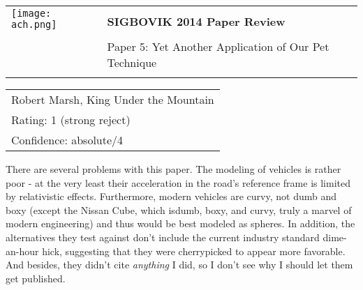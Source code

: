 \documentclass[12pt]{article}
\begin{document}
{\sffamily
\begin{tabular}{ll}
\multirow{2}{*}{\texttt{[image: ach.png]}}\\
& \textbf{\Huge{SIGBOVIK 2014 Paper Review}} \\ &\\
& \LARGE{Paper 5: Yet Another Application of Our Pet Technique} \\
&\\
\hline
\end{tabular}}
\vspace{2em}

{\large\bf
\begin{tabular}{l}
Robert Marsh, King Under the Mountain \\
Rating: 1 (strong reject) \\
Confidence: absolute/4 \\
\end{tabular}}
\vspace{1em}

There are several problems with this paper.
The modeling of vehicles is rather poor - at the very least their acceleration in the road's reference frame is limited by relativistic effects.
Furthermore, modern vehicles are curvy, not dumb and boxy (except the Nissan Cube, which isdumb, boxy, and curvy, truly a marvel of modern engineering) and thus would be best modeled as spheres.
In addition, the alternatives they test against don't include the current industry standard dime-an-hour hick, suggesting that they were cherrypicked to appear more favorable.
And besides, they didn't cite \emph{anything} I did, so I don't see why I should let them get published.
\end{document}
